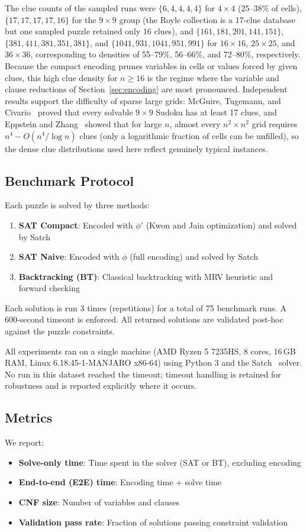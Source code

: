 \documentclass[12pt]{article}
\begin{document}
The clue counts of the sampled runs were $\{6,4,4,4,4\}$ for $4\times4$ (25--38\% of cells), $\{17,17,17,17,16\}$ for the $9\times9$ group (the Royle collection is a 17-clue database but one sampled puzzle retained only 16 clues), and $\{161,181,201,141,151\}$, $\{381,411,381,351,381\}$, and $\{1041,931,1041,951,991\}$ for $16\times16$, $25\times25$, and $36\times36$, corresponding to densities of 55--79\%, 56--66\%, and 72--80\%, respectively. Because the compact encoding prunes variables in cells or values forced by given clues, this high clue density for $n \geq 16$ is the regime where the variable and clause reductions of Section~\ref{sec:encoding} are most pronounced. Independent results support the difficulty of sparse large grids: McGuire, Tugemann, and Civario~\citep{McGuire2014} proved that every solvable $9\times9$ Sudoku has at least 17 clues, and Eppstein and Zhang~\citep{EppsteinZhang2026} showed that for large $n$, almost every $n^2\times n^2$ grid requires $n^4 - O(n^4/\log n)$ clues (only a logarithmic fraction of cells can be unfilled), so the dense clue distributions used here reflect genuinely typical instances.

\subsection{Benchmark Protocol}
Each puzzle is solved by three methods:
\begin{enumerate}
    \item \textbf{SAT Compact}: Encoded with $\phi'$ (Kwon and Jain optimization) and solved by Satch
    \item \textbf{SAT Naive}: Encoded with $\phi$ (full encoding) and solved by Satch
    \item \textbf{Backtracking (BT)}: Classical backtracking with MRV heuristic and forward checking
\end{enumerate}

\noindent Each solution is run 3 times (repetitions) for a total of 75 benchmark runs. A 600-second timeout is enforced. All returned solutions are validated post-hoc against the puzzle constraints.

All experiments ran on a single machine (AMD Ryzen 5 7235HS, 8 cores, 16\,GB RAM, Linux 6.18.45-1-MANJARO x86-64) using Python 3 and the Satch~\citep{Satch} solver. No run in this dataset reached the timeout; timeout handling is retained for robustness and is reported explicitly where it occurs.

\subsection{Metrics}
We report:
\begin{itemize}
    \item \textbf{Solve-only time}: Time spent in the solver (SAT or BT), excluding encoding
    \item \textbf{End-to-end (E2E) time}: Encoding time + solve time
    \item \textbf{CNF size}: Number of variables and clauses
    \item \textbf{Validation pass rate}: Fraction of solutions passing constraint validation
\end{itemize}
\end{document}

